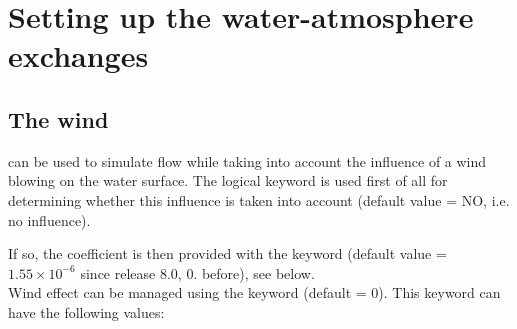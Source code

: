 \section{Setting up the water-atmosphere exchanges}

\subsection{The wind}

 can be used to simulate flow while taking into account the influence
of a wind blowing on the water surface. The logical keyword  is
used first of all for determining whether this influence is taken into account
(default value = NO, i.e. no influence).

If so, the coefficient is then provided with the keyword
 (default value =
$1.55 \times 10^{-6}$ since release 8.0, 0. before), see below.\\

Wind effect can be managed using the keyword 
(default = 0). This keyword can have the following values:

